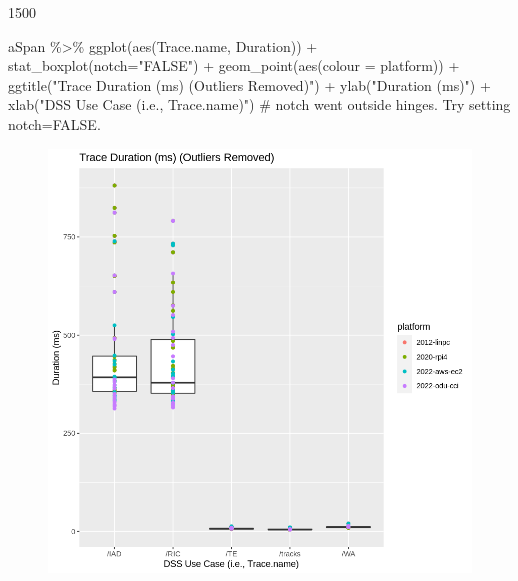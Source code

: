 \documentclass[
  letterpaper,
  DIV=11,
  numbers=noendperiod]{scrartcl}
\newenvironment{Shaded}{\begin{snugshade}}{\end{snugshade}}
\newcommand{\AttributeTok}[1]{\textcolor[rgb]{0.40,0.45,0.13}{#1}}
\newcommand{\CommentTok}[1]{\textcolor[rgb]{0.37,0.37,0.37}{#1}}
\newcommand{\FunctionTok}[1]{\textcolor[rgb]{0.28,0.35,0.67}{#1}}
\newcommand{\NormalTok}[1]{\textcolor[rgb]{0.00,0.23,0.31}{#1}}
\newcommand{\SpecialCharTok}[1]{\textcolor[rgb]{0.37,0.37,0.37}{#1}}
\newcommand{\StringTok}[1]{\textcolor[rgb]{0.13,0.47,0.30}{#1}}
\begin{document}
1500

\begin{Shaded}
\begin{Highlighting}[]
\NormalTok{aSpan }\SpecialCharTok{\%\textgreater{}\%}
    \FunctionTok{ggplot}\NormalTok{(}\FunctionTok{aes}\NormalTok{(Trace.name, Duration)) }\SpecialCharTok{+} 
    \FunctionTok{stat\_boxplot}\NormalTok{(}\AttributeTok{notch=}\StringTok{"FALSE"}\NormalTok{) }\SpecialCharTok{+} \FunctionTok{geom\_point}\NormalTok{(}\FunctionTok{aes}\NormalTok{(}\AttributeTok{colour =}\NormalTok{ platform)) }\SpecialCharTok{+}
    \FunctionTok{ggtitle}\NormalTok{(}\StringTok{"Trace Duration (ms) (Outliers Removed)"}\NormalTok{) }\SpecialCharTok{+}
    \FunctionTok{ylab}\NormalTok{(}\StringTok{"Duration (ms)"}\NormalTok{) }\SpecialCharTok{+}
    \FunctionTok{xlab}\NormalTok{(}\StringTok{"DSS Use Case (i.e., Trace.name)"}\NormalTok{)}
\CommentTok{\# notch went outside hinges. Try setting notch=FALSE.}
\end{Highlighting}
\end{Shaded}

\begin{figure}[H]

{\centering \includegraphics{dss-span-analysis-rev5_files/figure-pdf/cell-27-output-1.png}

}

\end{figure}
\end{document}
